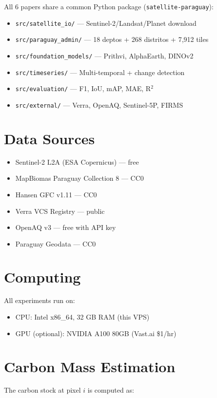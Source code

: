 \documentclass[12pt,a4paper,oneside]{book}
\begin{document}
All 6 papers share a common Python package (\texttt{satellite-paraguay}):

\begin{itemize}
\item \texttt{src/satellite\_io/} — Sentinel-2/Landsat/Planet download
\item \texttt{src/paraguay\_admin/} — 18 deptos + 268 distritos + 7,912 tiles
\item \texttt{src/foundation\_models/} — Prithvi, AlphaEarth, DINOv2
\item \texttt{src/timeseries/} — Multi-temporal + change detection
\item \texttt{src/evaluation/} — F1, IoU, mAP, MAE, R$^2$
\item \texttt{src/external/} — Verra, OpenAQ, Sentinel-5P, FIRMS
\end{itemize}

\section{Data Sources}

\begin{itemize}
\item Sentinel-2 L2A (ESA Copernicus) — free
\item MapBiomas Paraguay Collection 8 — CC0
\item Hansen GFC v1.11 — CC0
\item Verra VCS Registry — public
\item OpenAQ v3 — free with API key
\item Paraguay Geodata — CC0
\end{itemize}

\section{Computing}

All experiments run on:
\begin{itemize}
\item CPU: Intel x86\_64, 32 GB RAM (this VPS)
\item GPU (optional): NVIDIA A100 80GB (Vast.ai \$1/hr)
\end{itemize}

\section{Carbon Mass Estimation}

The carbon stock at pixel $i$ is computed as:
\end{document}
